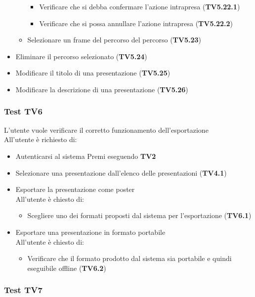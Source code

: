 \begin{itemize}
\begin{itemize}
\begin{itemize}
    	     	\item Verificare che si debba confermare l'azione intrapresa (\textbf{TV5.22.1})
    	     	\item Verificare che si possa annullare l'azione intrapresa (\textbf{TV5.22.2})
    	     \end{itemize}
    	\item Selezionare un frame del percorso del percorso (\textbf{TV5.23})
    \end{itemize}
    \item Eliminare il percorso selezionato (\textbf{TV5.24})
    \item Modificare il titolo di una presentazione (\textbf{TV5.25})
    \item Modificare la descrizione di una presentazione (\textbf{TV5.26})
\end{itemize}


\subsubsection {Test TV6} %

L'utente vuole verificare il corretto funzionamento dell'esportazione\\
All'utente è richiesto di:

\begin{itemize}
	\item Autenticarsi al sistema Premi eseguendo \textbf{TV2}
	\item Selezionare una presentazione dall'elenco delle presentazioni  (\textbf{TV4.1})
	\item Esportare la presentazione come poster\\
	All'utente è chiesto di:
 \begin{itemize}
 	\item Scegliere uno  dei formati proposti dal sistema per l'esportazione (\textbf{TV6.1})
 	\end{itemize}
	\item Esportare una presentazione in formato portabile\\
	All'utente è chiesto di:
	 \begin{itemize}
	 	\item Verificare che il formato prodotto dal sistema sia portabile e quindi eseguibile offline (\textbf{TV6.2})
	 \end{itemize}
\end{itemize}


\subsubsection {Test TV7} %

